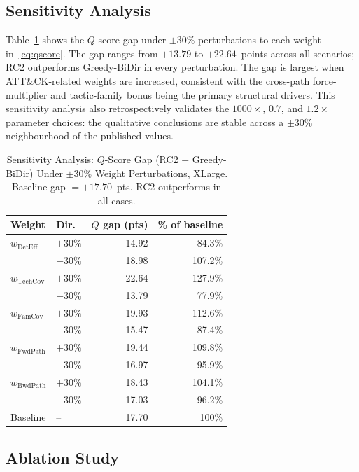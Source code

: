 \documentclass[journal]{IEEEtran}
\newcommand{\qscore}{$Q$-score}
\begin{document}
\subsection{Sensitivity Analysis}
\label{sec:results:sensitivity}

Table~\ref{tab:sensitivity} shows the \qscore{} gap under $\pm30\%$
perturbations to each weight in~\eqref{eq:qscore}. The gap ranges
from $+13.79$ to $+22.64$~points across all scenarios; RC2
outperforms Greedy-BiDir in every perturbation. The gap is largest
when ATT\&CK-related weights are increased, consistent with the
cross-path force-multiplier and tactic-family bonus being the
primary structural drivers. This sensitivity analysis also
retrospectively validates the $1000\times$, $0.7$, and $1.2\times$
parameter choices: the qualitative conclusions are stable across a
$\pm30\%$ neighbourhood of the published values.

\begin{table}[t]
\caption{Sensitivity Analysis: $Q$-Score Gap (RC2 $-$ Greedy-BiDir)
  Under $\pm30\%$ Weight Perturbations, XLarge.
  Baseline gap $=+17.70$~pts. RC2 outperforms in all cases.}
\label{tab:sensitivity}
\centering
\renewcommand{\arraystretch}{1.2}
\begin{tabular}{llrr}
\toprule
Weight & Dir. & $Q$ gap (pts) & \% of baseline \\
\midrule
$w_{\mathrm{DetEff}}$  & $+30\%$ & 14.92 & 84.3\% \\
                        & $-30\%$ & 18.98 & 107.2\% \\
$w_{\mathrm{TechCov}}$ & $+30\%$ & 22.64 & 127.9\% \\
                        & $-30\%$ & 13.79 & 77.9\% \\
$w_{\mathrm{FamCov}}$  & $+30\%$ & 19.93 & 112.6\% \\
                        & $-30\%$ & 15.47 & 87.4\% \\
$w_{\mathrm{FwdPath}}$ & $+30\%$ & 19.44 & 109.8\% \\
                        & $-30\%$ & 16.97 & 95.9\% \\
$w_{\mathrm{BwdPath}}$ & $+30\%$ & 18.43 & 104.1\% \\
                        & $-30\%$ & 17.03 & 96.2\% \\
\midrule
Baseline & -- & 17.70 & 100\% \\
\bottomrule
\end{tabular}
\end{table}

\subsection{Ablation Study}
\label{sec:results:ablation}
\end{document}
